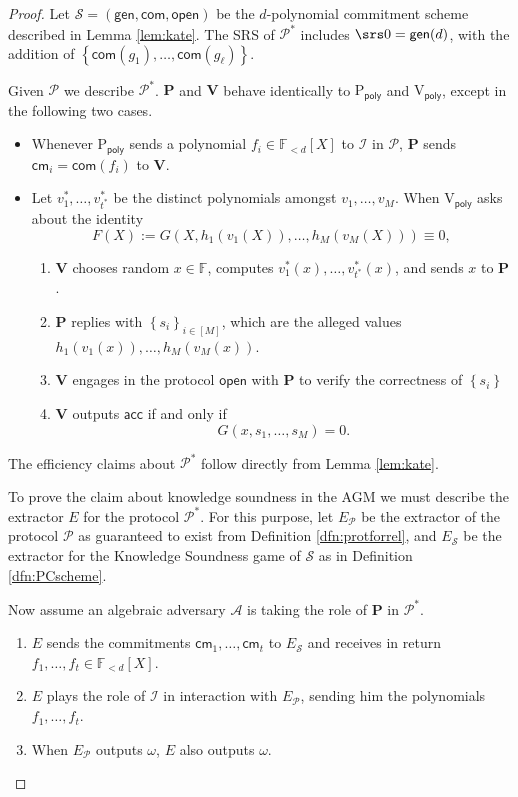 \documentclass[11pt]{article} %
\newcommand{\F}{\ensuremath{\mathbb F}\xspace}
\newcommand{\adv}{\ensuremath{\mathcal A}\xspace}
\newcommand{\com}{\ensuremath{\mathsf{com}}\xspace}
\newcommand{\cm}{\ensuremath{\mathsf{cm}}\xspace}
\newcommand{\open}{\ensuremath{\mathsf{open}}\xspace}
\newcommand{\acc}{\ensuremath{\mathsf{acc}}\xspace}
\newcommand{\defeq}{:=}
\newcommand{\sett}[2]{\ensuremath{\set{#1}_{#2}}\xspace}
\newcommand{\gen}{\ensuremath{\mathsf{gen}}\xspace}
\newcommand{\prv}{\ensuremath{\mathsf{\mathbf{P}}}\xspace}
\newcommand{\prvpoly}{\ensuremath{\mathrm{P_{\mathsf{poly}}}}\xspace}
\newcommand{\verpoly}{\ensuremath{\mathrm{V_{\mathsf{poly}}}}\xspace}
\newcommand{\ideal}{\ensuremath{\mathcal{I}}\xspace}
\newcommand{\wit}{\ensuremath{\omega}\xspace}
\newcommand{\ver}{\ensuremath{\mathsf{\mathbf{V}}}\xspace}
\newcommand{\ext}{\ensuremath{E}\xspace}
\newcommand{\set}[1]{\ensuremath{\left\{#1\right\}}\xspace}
\newcommand{\polysofdeg}[1]{\ensuremath{\F_{< #1}[X]}\xspace}
\newcommand{\prot}{\ensuremath{\mathscr{P}}\xspace}
\newcommand{\PCscheme}{\ensuremath{\mathscr{S}}\xspace}
\newcommand{\protprime}{\ensuremath{\mathscr{P^*}}\xspace}
\newcommand{\extprot}{\ensuremath{E_{\prot}}\xspace}
\newcommand{\extpc}{\ensuremath{E_{\PCscheme}}\xspace}
\begin{document}
\begin{proof}
Let $\PCscheme=(\gen,\com,\open)$ be the $d$-polynomial commitment scheme described in Lemma \ref{lem:kate}.
The SRS of \protprime includes $\srs0=\gen(d)$,
with the addition of $\set{\com(g_1),\ldots,\com(g_\ell)}$.

Given \prot we describe \protprime. \prv and \ver behave identically to \prvpoly and \verpoly,
except in the following two cases.
\begin{itemize}
 \item Whenever \prvpoly sends a polynomial $f_i\in \polysofdeg{d}$ to \ideal in \prot, \prv sends $\cm_i = \com(f_i)$ to  \ver.
 \item Let $v^*_1,\ldots,v^*_{t^*}$ be the distinct polynomials amongst $v_1,\ldots,v_{M}$.
 When \verpoly asks about the identity
  \[F(X)\defeq G(X, h_1(v_1(X)),\ldots,h_{M}(v_{M}(X)))\equiv 0,\]
  \begin{enumerate}
 \item \ver chooses random $x\in \F$, computes $v^*_1(x),\ldots,v^*_{t^*}(x)$, and sends $x$ to \prv. 
 \item \prv replies with \sett{s_i}{i\in [M]}, which are the alleged values $h_1(v_1(x)),\ldots,h_{M}(v_{M}(x))$.

\item\label{step:open} \ver engages in the protocol \open with \prv to verify the correctness of \set{s_i}
\item \ver outputs \acc if and only if 
  \[G(x,s_1,\ldots,s_{M})= 0.\]

  \end{enumerate}


\end{itemize}

The efficiency claims about \protprime follow directly from Lemma \ref{lem:kate}.


To prove the claim about knowledge soundness in the AGM we must describe the extractor \ext for the protocol \protprime.
For this purpose, let \extprot be the extractor of the protocol \prot as guaranteed to exist from Definition \ref{dfn:protforrel}, and \extpc be the extractor for the Knowledge Soundness game of \PCscheme as in Definition \ref{dfn:PCscheme}.


Now assume an algebraic adversary \adv is taking the role of \prv in \protprime.
\begin{enumerate}
 \item \ext sends the commitments $\cm_1,\ldots,\cm_t$  to \extpc and receives in return $f_1,\ldots,f_t \in \polysofdeg{d}$.
 \item \ext plays the role of \ideal in interaction with \extprot, sending him the polynomials $f_1,\ldots,f_t$.
 \item When \extprot outputs \wit, \ext also outputs \wit.
\end{enumerate}


\end{proof}
\end{document}
